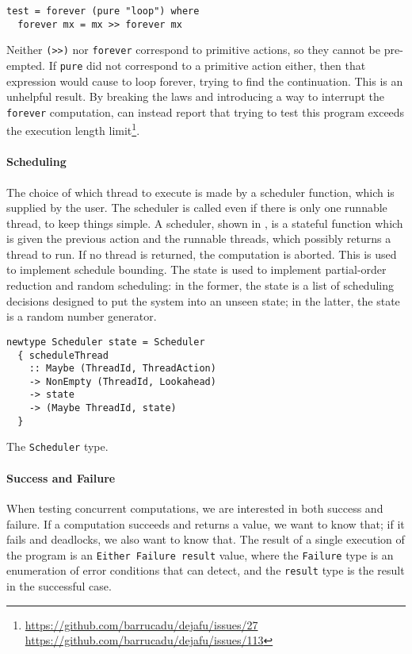 \begin{verbatim}
test = forever (pure "loop") where
  forever mx = mx >> forever mx
\end{verbatim}

Neither \verb|(>>)| nor \verb|forever| correspond to primitive actions, so they
cannot be pre-empted.  If \verb|pure| did not correspond to a primitive action
either, then that expression would cause \dejafu{} to loop forever, trying to
find the continuation.  This is an unhelpful result.  By breaking the laws and
introducing a way to interrupt the \verb|forever| computation, \dejafu{} can
instead report that trying to test this program exceeds the execution length
limit\footnote{\url{https://github.com/barrucadu/dejafu/issues/27}\\\url{https://github.com/barrucadu/dejafu/issues/113}}.

\paragraph{Scheduling}
The choice of which thread to execute is made by a scheduler function, which is
supplied by the user.  The scheduler is called even if there is only one
runnable thread, to keep things simple.  A scheduler, shown in
, is a stateful function which is given the previous action
and the runnable threads, which possibly returns a thread to run.  If no thread
is returned, the computation is aborted.  This is used to implement schedule
bounding.  The state is used to implement partial-order reduction and random
scheduling: in the former, the state is a list of scheduling decisions designed
to put the system into an unseen state; in the latter, the state is a random
number generator.

\begin{listing}
  \begin{verbatim}
newtype Scheduler state = Scheduler
  { scheduleThread
    :: Maybe (ThreadId, ThreadAction)
    -> NonEmpty (ThreadId, Lookahead)
    -> state
    -> (Maybe ThreadId, state)
  }
  \end{verbatim}
  \caption{The \texttt{Scheduler} type.}\label{lst:scheduler}
\end{listing}

\paragraph{Success and Failure}
When testing concurrent computations, we are interested in both
success and failure.  If a computation succeeds and returns a value,
we want to know that; if it fails and deadlocks, we also want to know
that.  The result of a single execution of the program is an
\verb|Either Failure result| value, where the \verb|Failure| type is
an enumeration of error conditions that \dejafu{} can detect, and the
\verb|result| type is the result in the successful case.

